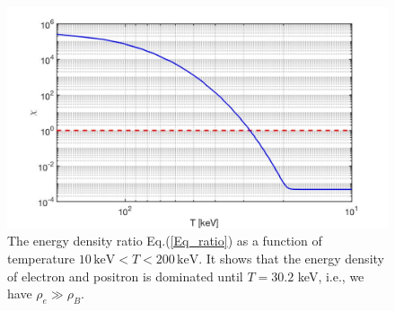 \documentclass[Universe,article,submit,moreauthors,pdftex]{Definitions/mdpi}
\begin{document}
\begin{figure}[h]
\centering
\includegraphics[width=\linewidth]{EnergyDensityRatio002.jpg}
\caption{The energy density ratio Eq.(\ref{Eq_ratio}) as a function of temperature $10\,\mathrm{keV}< T<200\,\mathrm{keV}$. It shows that the energy density of electron and positron is dominated until $T=30.2$ keV, i.e.,  we have $\rho_{e}\gg\rho_B$.}
\label{ratio_fig} 
\end{figure}
\end{document}
